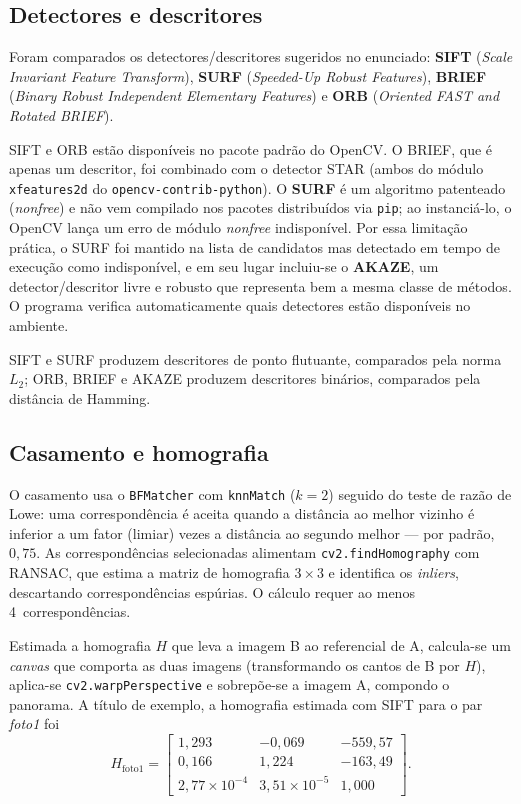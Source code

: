\documentclass[12pt,a4paper]{article}
\begin{document}
\subsection{Detectores e descritores}
\label{sec:detectores}

Foram comparados os detectores/descritores sugeridos no enunciado: \textbf{SIFT}
(\emph{Scale Invariant Feature Transform}), \textbf{SURF} (\emph{Speeded-Up
Robust Features}), \textbf{BRIEF} (\emph{Binary Robust Independent Elementary
Features}) e \textbf{ORB} (\emph{Oriented FAST and Rotated BRIEF}).

SIFT e ORB estão disponíveis no pacote padrão do OpenCV. O BRIEF, que é apenas
um descritor, foi combinado com o detector STAR (ambos do módulo
\texttt{xfeatures2d} do \texttt{opencv-contrib-python}). O \textbf{SURF} é um
algoritmo patenteado (\emph{nonfree}) e não vem compilado nos pacotes
distribuídos via \texttt{pip}; ao instanciá-lo, o OpenCV lança um erro de módulo
\emph{nonfree} indisponível. Por essa limitação prática, o SURF foi mantido na
lista de candidatos mas detectado em tempo de execução como indisponível, e em
seu lugar incluiu-se o \textbf{AKAZE}, um detector/descritor livre e robusto que
representa bem a mesma classe de métodos. O programa verifica automaticamente
quais detectores estão disponíveis no ambiente.

SIFT e SURF produzem descritores de ponto flutuante, comparados pela norma~$L_2$;
ORB, BRIEF e AKAZE produzem descritores binários, comparados pela distância de
Hamming.

\subsection{Casamento e homografia}

O casamento usa o \texttt{BFMatcher} com \texttt{knnMatch} ($k = 2$) seguido do
teste de razão de Lowe: uma correspondência é aceita quando a distância ao
melhor vizinho é inferior a um fator (limiar) vezes a distância ao segundo
melhor --- por padrão, $0{,}75$. As correspondências selecionadas alimentam
\texttt{cv2.findHomography} com RANSAC, que estima a matriz de homografia
$3 \times 3$ e identifica os \emph{inliers}, descartando correspondências
espúrias. O cálculo requer ao menos 4~correspondências.

Estimada a homografia $H$ que leva a imagem B ao referencial de A, calcula-se um
\emph{canvas} que comporta as duas imagens (transformando os cantos de B por
$H$), aplica-se \texttt{cv2.warpPerspective} e sobrepõe-se a imagem A,
compondo o panorama. A título de exemplo, a homografia estimada com SIFT para o
par \emph{foto1} foi
\begin{equation*}
  H_{\text{foto1}} =
  \begin{bmatrix}
     1{,}293 & -0{,}069 & -559{,}57 \\
     0{,}166 &  1{,}224 & -163{,}49 \\
     2{,}77\!\times\!10^{-4} & 3{,}51\!\times\!10^{-5} & 1{,}000
  \end{bmatrix}.
\end{equation*}
\end{document}
